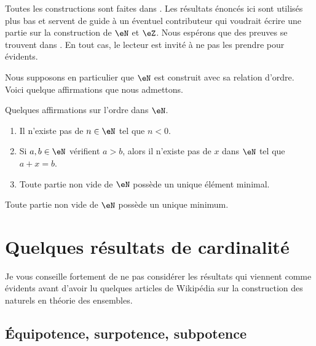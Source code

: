 Toutes les constructions sont faites dans \cite{RWWJooJdjxEK}. Les résultats énoncés ici sont utilisés plus bas et servent de guide à un éventuel contributeur qui voudrait écrire une partie sur la construction de \( \eN\) et \( \eZ\). Nous espérons que des preuves se trouvent dans \cite{RWWJooJdjxEK}. En tout cas, le lecteur est invité à ne pas les prendre pour évidents.

Nous supposons en particulier que \( \eN\) est construit avec sa relation d'ordre. Voici quelque affirmations que nous admettons.

\begin{lemma}       \label{LEMooYMRJooYIAhBb}
    Quelques affirmations sur l'ordre dans \( \eN\).
    \begin{enumerate}
        \item
            Il n'existe pas de \( n\in \eN\) tel que \( n<0\).
        \item
            Si \( a,b\in \eN\) vérifient \( a>b\), alors il n'existe pas de \( x\) dans \( \eN\) tel que \( a+x=b\).
        \item       \label{ITEMooNHRIooODBVNK}
            Toute partie non vide de \( \eN\) possède un unique élément minimal.
    \end{enumerate}
\end{lemma}

\begin{lemma}       \label{LEMooFHEOooSHPGgU}
    Toute partie non vide de \( \eN\) possède un unique minimum.
\end{lemma}


\section{Quelques résultats de cardinalité}

Je vous conseille fortement de ne pas considérer les résultats qui viennent comme évidents avant d'avoir lu quelques articles de Wikipédia sur la construction des naturels en théorie des ensembles.

\subsection{Équipotence, surpotence, subpotence}

